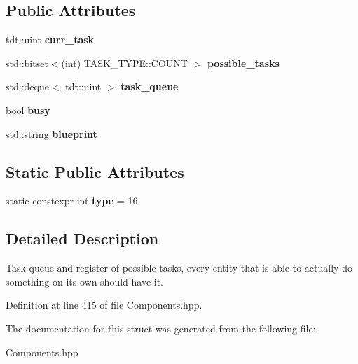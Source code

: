 \subsection*{Public Attributes}
\begin{DoxyCompactItemize}
\item 
tdt\+::uint {\bfseries curr\+\_\+task}\hypertarget{struct_task_handler_component_a63aefaaa68be4e2f46fa142acb1bd4f8}{}\label{struct_task_handler_component_a63aefaaa68be4e2f46fa142acb1bd4f8}

\item 
std\+::bitset$<$(int) T\+A\+S\+K\+\_\+\+T\+Y\+P\+E\+::\+C\+O\+U\+NT $>$ {\bfseries possible\+\_\+tasks}\hypertarget{struct_task_handler_component_ae4ece22f8aa6b800915ce49743c5bb21}{}\label{struct_task_handler_component_ae4ece22f8aa6b800915ce49743c5bb21}

\item 
std\+::deque$<$ tdt\+::uint $>$ {\bfseries task\+\_\+queue}\hypertarget{struct_task_handler_component_a9754b7c65f6992afa1e5ade63d28f626}{}\label{struct_task_handler_component_a9754b7c65f6992afa1e5ade63d28f626}

\item 
bool {\bfseries busy}\hypertarget{struct_task_handler_component_a6481b2a8188abc40d618a50cb37e7164}{}\label{struct_task_handler_component_a6481b2a8188abc40d618a50cb37e7164}

\item 
std\+::string {\bfseries blueprint}\hypertarget{struct_task_handler_component_a0530d5bca650606f819e614fe2dab3a8}{}\label{struct_task_handler_component_a0530d5bca650606f819e614fe2dab3a8}

\end{DoxyCompactItemize}
\subsection*{Static Public Attributes}
\begin{DoxyCompactItemize}
\item 
static constexpr int {\bfseries type} = 16\hypertarget{struct_task_handler_component_a12e6522dc9c13999683e1f624fc27dd0}{}\label{struct_task_handler_component_a12e6522dc9c13999683e1f624fc27dd0}

\end{DoxyCompactItemize}


\subsection{Detailed Description}
Task queue and register of possible tasks, every entity that is able to actually do something on it\textquotesingle{}s own should have it. 

Definition at line 415 of file Components.\+hpp.



The documentation for this struct was generated from the following file\+:\begin{DoxyCompactItemize}
\item 
Components.\+hpp\end{DoxyCompactItemize}
